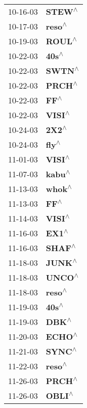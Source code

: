 \begin{supertabular}{p{0.08\textwidth}p{0.2\textwidth}}
 10-16-03 &    \textbf{STEW\textsuperscript{$\wedge$}} \\
 10-17-03 &    \textbf{reso\textsuperscript{$\wedge$}} \\
 10-19-03 &    \textbf{ROUL\textsuperscript{$\wedge$}} \\
 10-22-03 &     \textbf{40s\textsuperscript{$\wedge$}} \\
 10-22-03 &    \textbf{SWTN\textsuperscript{$\wedge$}} \\
 10-22-03 &    \textbf{PRCH\textsuperscript{$\wedge$}} \\
 10-22-03 &      \textbf{FF\textsuperscript{$\wedge$}} \\
 10-22-03 &    \textbf{VISI\textsuperscript{$\wedge$}} \\
 10-24-03 &     \textbf{2X2\textsuperscript{$\wedge$}} \\
 10-24-03 &     \textbf{fly\textsuperscript{$\wedge$}} \\
 11-01-03 &    \textbf{VISI\textsuperscript{$\wedge$}} \\
 11-07-03 &    \textbf{kabu\textsuperscript{$\wedge$}} \\
 11-13-03 &    \textbf{whok\textsuperscript{$\wedge$}} \\
 11-13-03 &      \textbf{FF\textsuperscript{$\wedge$}} \\
 11-14-03 &    \textbf{VISI\textsuperscript{$\wedge$}} \\
 11-16-03 &     \textbf{EX1\textsuperscript{$\wedge$}} \\
 11-16-03 &    \textbf{SHAF\textsuperscript{$\wedge$}} \\
 11-18-03 &    \textbf{JUNK\textsuperscript{$\wedge$}} \\
 11-18-03 &    \textbf{UNCO\textsuperscript{$\wedge$}} \\
 11-18-03 &    \textbf{reso\textsuperscript{$\wedge$}} \\
 11-19-03 &     \textbf{40s\textsuperscript{$\wedge$}} \\
 11-19-03 &     \textbf{DBK\textsuperscript{$\wedge$}} \\
 11-20-03 &    \textbf{ECHO\textsuperscript{$\wedge$}} \\
 11-21-03 &    \textbf{SYNC\textsuperscript{$\wedge$}} \\
 11-22-03 &    \textbf{reso\textsuperscript{$\wedge$}} \\
 11-26-03 &    \textbf{PRCH\textsuperscript{$\wedge$}} \\
 11-26-03 &    \textbf{OBLI\textsuperscript{$\wedge$}} \\

\end{supertabular}
